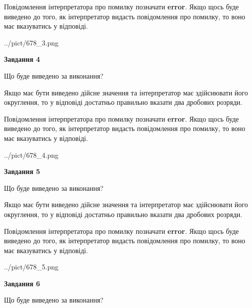 \documentclass[12pt, ukrainian]{article}
\begin{document}
{\begin {Large}
Повідомлення інтерпретатора про помилку позначати \textbf{error}.
Якщо щось буде виведено до того, як інтерпретатор видасть повідомлення про помилку, 
то воно має вказуватись у відповіді. \par

\begin{center}
	{../pict/678_3.png}
\end{center}
\newpage

{\begin {center}\textbf{Завдання 4}\end {center}}\par
Що буде виведено за виконання? \par

Якщо має бути виведено дійсне значення та інтерпретатор має здійснювати його округлення, 
то у відповіді достатньо правильно вказати два дробових розряди.

Повідомлення інтерпретатора про помилку позначати \textbf{error}.
Якщо щось буде виведено до того, як інтерпретатор видасть повідомлення про помилку, 
то воно має вказуватись у відповіді. \par

\begin{center}
	{../pict/678_4.png}
\end{center}
\newpage

{\begin {center}\textbf{Завдання 5}\end {center}}\par
Що буде виведено за виконання? \par

Якщо має бути виведено дійсне значення та інтерпретатор має здійснювати його округлення, 
то у відповіді достатньо правильно вказати два дробових розряди.

Повідомлення інтерпретатора про помилку позначати \textbf{error}.
Якщо щось буде виведено до того, як інтерпретатор видасть повідомлення про помилку, 
то воно має вказуватись у відповіді. \par

\begin{center}
	{../pict/678_5.png}
\end{center}
\newpage

{\begin {center}\textbf{Завдання 6}\end {center}}\par
Що буде виведено за виконання? \par


\end{Large}}
\end{document}
